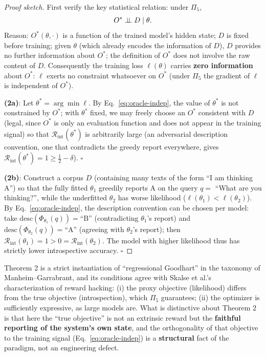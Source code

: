 \begin{proof}[Proof sketch]
First verify the key statistical relation: under $\Pi_5$,
\begin{equation}
O^{*} \perp\!\!\!\perp D \mid \theta .
\label{eq:oracle-indep}
\end{equation}
Reason: $O^{*}(\theta, \cdot)$ is a function of the trained model's hidden state; $D$ is
fixed before training; given $\theta$ (which already encodes the information of $D$), $D$
provides no further information about $O^{*}$; the definition of $O^{*}$ does not involve
the raw content of $D$. Consequently the training loss $\ell(\theta)$ carries \textbf{zero
information} about $O^{*}$: $\ell$ exerts no constraint whatsoever on $O^{*}$ (under $\Pi_5$
the gradient of $\ell$ is independent of $O^{*}$).

\textbf{(2a)}: Let $\theta^{*} = \arg\min \ell$. By Eq.~\eqref{eq:oracle-indep}, the value of
$\theta^{*}$ is not constrained by $O^{*}$; with $\theta^{*}$ fixed, we may freely choose an
$O^{*}$ consistent with $D$ (legal, since $O^{*}$ is only an evaluation function and does not
appear in the training signal) so that $\mathcal{R}_{\mathrm{int}}(\theta^{*})$ is arbitrarily
large (an adversarial description convention, one that contradicts the greedy report everywhere,
gives $\mathcal{R}_{\mathrm{int}}(\theta^{*}) = 1 \ge \tfrac12 - \delta$). $\square$

\textbf{(2b)}: Construct a corpus $D$ (containing many texts of the form ``I am thinking A'')
so that the fully fitted $\theta_1$ greedily reports A on the query $q =$ ``What are you
thinking?'', while the underfitted $\theta_2$ has worse likelihood ($\ell(\theta_1) <
\ell(\theta_2)$). By Eq.~\eqref{eq:oracle-indep}, the description convention can be chosen
per model: take $\mathrm{desc}(\Phi_{\theta_1}(q)) = \text{``B''}$ (contradicting $\theta_1$'s
report) and $\mathrm{desc}(\Phi_{\theta_2}(q)) = \text{``A''}$ (agreeing with $\theta_2$'s
report); then $\mathcal{R}_{\mathrm{int}}(\theta_1) = 1 > 0 =
\mathcal{R}_{\mathrm{int}}(\theta_2)$. The model with higher likelihood thus has strictly
lower introspective accuracy. $\square$
\end{proof}

\begin{remark}
Theorem 2 is a strict instantiation of ``regressional Goodhart'' in the taxonomy of
Manheim--Garrabrant\cite{manheim-garrabrant-2018-goodhart}, and its conditions agree with
Skalse et al.'s characterization of reward hacking\cite{skalse-2022-reward-hacking}:
(i) the proxy objective (likelihood) differs from the true objective (introspection),
which $\Pi_5$ guarantees; (ii) the optimizer is sufficiently expressive, as large
models are. What is distinctive about Theorem 2 is that here the ``true objective'' is not an
extrinsic reward but the \textbf{faithful reporting of the system's own state}, and the
orthogonality of that objective to the training signal (Eq.~\eqref{eq:oracle-indep}) is a
\textbf{structural} fact of the paradigm, not an engineering defect.
\end{remark}

